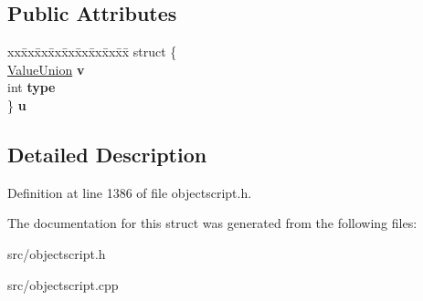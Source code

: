 \subsection*{Public Attributes}
\begin{DoxyCompactItemize}
\item 
\begin{tabbing}
xx\=xx\=xx\=xx\=xx\=xx\=xx\=xx\=xx\=\kill
struct \{\\
\>\hyperlink{union_object_script_1_1_o_s_1_1_core_1_1_value_union}{ValueUnion} {\bfseries v}\\
\>int {\bfseries type}\\
\} {\bfseries u}\hypertarget{struct_object_script_1_1_o_s_1_1_core_1_1_value_aa80e7ef0dd0fcb8c4832c03c69686e4f}{}\label{struct_object_script_1_1_o_s_1_1_core_1_1_value_aa80e7ef0dd0fcb8c4832c03c69686e4f}
\\

\end{tabbing}\end{DoxyCompactItemize}


\subsection{Detailed Description}


Definition at line 1386 of file objectscript.\+h.



The documentation for this struct was generated from the following files\+:\begin{DoxyCompactItemize}
\item 
src/objectscript.\+h\item 
src/objectscript.\+cpp\end{DoxyCompactItemize}
